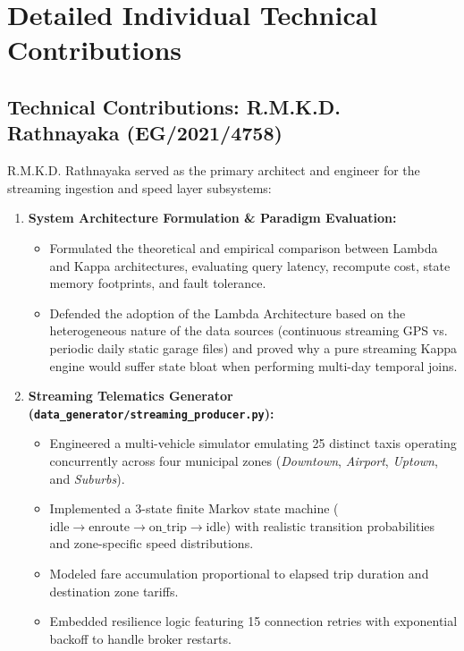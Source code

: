 \documentclass[11pt,a4paper]{article}
\begin{document}
\clearpage

\section{Detailed Individual Technical Contributions}

\subsection{Technical Contributions: R.M.K.D. Rathnayaka (EG/2021/4758)}
R.M.K.D. Rathnayaka served as the primary architect and engineer for the streaming ingestion and speed layer subsystems:

\begin{enumerate}
    \item \textbf{System Architecture Formulation \& Paradigm Evaluation:}
    \begin{itemize}
        \item Formulated the theoretical and empirical comparison between Lambda and Kappa architectures, evaluating query latency, recompute cost, state memory footprints, and fault tolerance.
        \item Defended the adoption of the Lambda Architecture based on the heterogeneous nature of the data sources (continuous streaming GPS vs. periodic daily static garage files) and proved why a pure streaming Kappa engine would suffer state bloat when performing multi-day temporal joins.
    \end{itemize}

    \item \textbf{Streaming Telematics Generator (\texttt{data\_generator/streaming\_producer.py}):}
    \begin{itemize}
        \item Engineered a multi-vehicle simulator emulating 25 distinct taxis operating concurrently across four municipal zones (\textit{Downtown}, \textit{Airport}, \textit{Uptown}, and \textit{Suburbs}).
        \item Implemented a 3-state finite Markov state machine ($\text{idle} \to \text{enroute} \to \text{on\_trip} \to \text{idle}$) with realistic transition probabilities and zone-specific speed distributions.
        \item Modeled fare accumulation proportional to elapsed trip duration and destination zone tariffs.
        \item Embedded resilience logic featuring 15 connection retries with exponential backoff to handle broker restarts.
    \end{itemize}


\end{enumerate}
\end{document}
